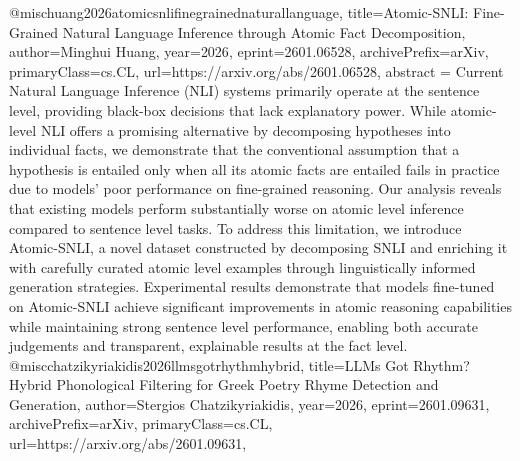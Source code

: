 {}@misc{huang2026atomicsnlifinegrainednaturallanguage,
      title={Atomic-SNLI: Fine-Grained Natural Language Inference through Atomic Fact Decomposition}, 
      author={Minghui Huang},
      year={2026},
      eprint={2601.06528},
      archivePrefix={arXiv},
      primaryClass={cs.CL},
      url={https://arxiv.org/abs/2601.06528},
      abstract = {Current Natural Language Inference (NLI) systems primarily operate at the sentence level, providing black-box decisions that lack explanatory power. While atomic-level NLI offers a promising alternative by decomposing hypotheses into individual facts, we demonstrate that the conventional assumption that a hypothesis is entailed only when all its atomic facts are entailed fails in practice due to models' poor performance on fine-grained reasoning. Our analysis reveals that existing models perform substantially worse on atomic level inference compared to sentence level tasks. To address this limitation, we introduce Atomic-SNLI, a novel dataset constructed by decomposing SNLI and enriching it with carefully curated atomic level examples through linguistically informed generation strategies. Experimental results demonstrate that models fine-tuned on Atomic-SNLI achieve significant improvements in atomic reasoning capabilities while maintaining strong sentence level performance, enabling both accurate judgements and transparent, explainable results at the fact level.}
}@misc{chatzikyriakidis2026llmsgotrhythmhybrid,
      title={LLMs Got Rhythm? Hybrid Phonological Filtering for Greek Poetry Rhyme Detection and Generation}, 
      author={Stergios Chatzikyriakidis},
      year={2026},
      eprint={2601.09631},
      archivePrefix={arXiv},
      primaryClass={cs.CL},
      url={https://arxiv.org/abs/2601.09631},
}
